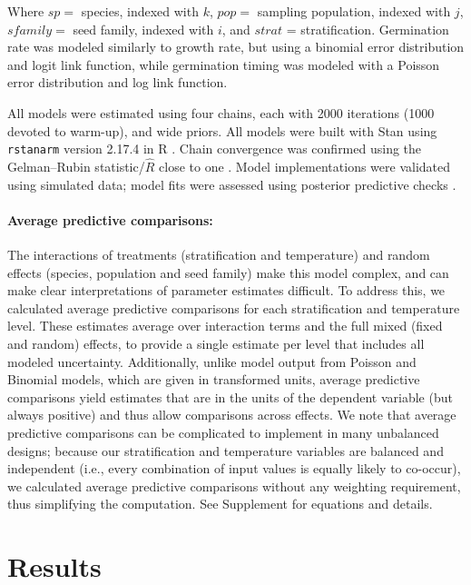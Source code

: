 \documentclass[12pt]{article}\usepackage[]{graphicx}\usepackage[]{color}
\begin{document}
	 Where $sp = $ species, indexed with $k$, $pop =$ sampling population, indexed with $j$, $sfamily =$ seed family, indexed with $i$, and $strat$ = stratification. Germination rate was modeled similarly to growth rate, but using a binomial error distribution and logit link function, while germination timing was modeled with a Poisson error distribution and log link function. 


	All models were estimated using four chains, each with 2000 iterations (1000 devoted to warm-up), and wide priors. All models were built with Stan \parencite{Carpenter2017} using \texttt{rstanarm} version 2.17.4 \parencite{Goodrich2018} in R \parencite{Team2015}. Chain convergence was confirmed using the Gelman--Rubin statistic/$\hat{R}$ close to one \parencite{Gelman1992}. Model implementations were validated using simulated data; model fits were assessed using posterior predictive checks \parencite{Gelman2004}.  
	
	\paragraph{Average predictive comparisons:} The interactions of treatments (stratification and temperature) and random effects (species, population and seed family) make this model complex, and can make clear interpretations of parameter estimates difficult. To address this, we calculated average predictive comparisons \parencite{Gelman2007} for each stratification and  temperature level. These estimates average over interaction terms and the full mixed (fixed and random) effects, to provide a single estimate per level that includes all modeled uncertainty. Additionally, unlike model output from Poisson and Binomial models, which are given in transformed units, average predictive comparisons yield estimates that are in the units of the dependent variable (but always positive) \parencite{Gelman2007} and thus allow comparisons across effects. We note that average predictive comparisons can be complicated to implement in many unbalanced designs; because our stratification and temperature variables are balanced and independent (i.e., every combination of input values is equally likely to co-occur), we calculated average predictive comparisons without any weighting requirement, thus simplifying the computation. See Supplement for equations and details.

	\section{Results} 
\end{document}
